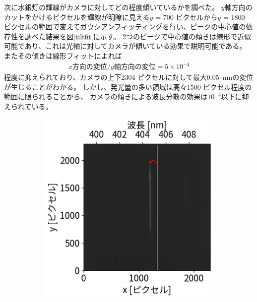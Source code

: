 \documentclass[a4paper,11pt,uplatex]{jsbook}
\begin{document}
次に水銀灯の輝線がカメラに対してどの程度傾いているかを調べた。
$y$軸方向のカットをかけるピクセルを輝線が明瞭に見える$y$ = 700 ピクセルから$y$ = 1800 ピクセルの範囲で変えてガウシアンフィッティングを行い、ピークの中心値の依存性を調べた結果を図\ref{tiltfit}に示す。
2つのピークで中心値の傾きは線形で近似可能であり、これは光軸に対してカメラが傾いている効果で説明可能である。
またその傾きは線形フィットによれば
\begin{eqnarray}
  x方向の変位 / y軸方向の変位 = 5 \times 10^{-4}
\end{eqnarray}
程度に抑えられており、カメラの上下2304 ピクセルに対して最大0.05~nmの変位が生じることがわかる。
しかし、発光量の多い領域は高々1500 ピクセル程度の範囲に限られることから、
カメラの傾きによる波長分散の効果は$10^{-4}$以下に抑えられている。
\begin{figure}[h]
  \centering
  \begin{subfigure}[h]{0.3\linewidth}
    \centering
    \includegraphics[width=\linewidth]{image/4-tilt.png}
  \end{subfigure}
  \hfill
  \begin{subfigure}[h]{0.3\linewidth}
    \centering

\end{subfigure}
\end{figure}
\end{document}
